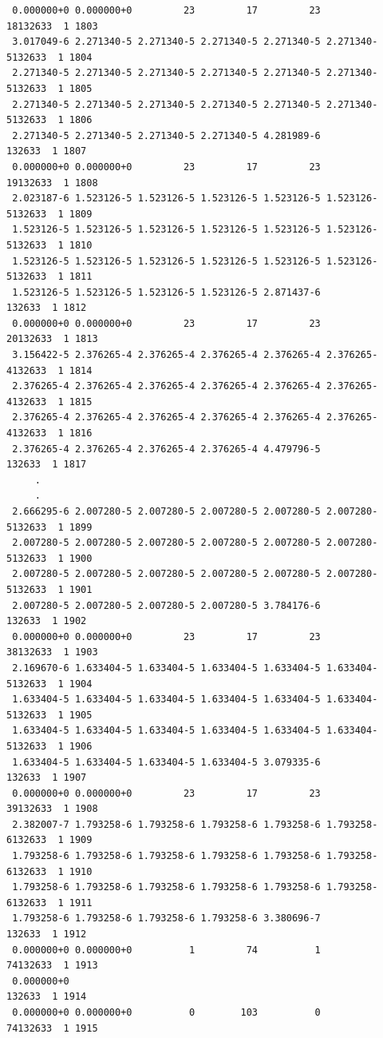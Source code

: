 \begin{verbatim}
 0.000000+0 0.000000+0         23         17         23         18132633  1 1803
 3.017049-6 2.271340-5 2.271340-5 2.271340-5 2.271340-5 2.271340-5132633  1 1804
 2.271340-5 2.271340-5 2.271340-5 2.271340-5 2.271340-5 2.271340-5132633  1 1805
 2.271340-5 2.271340-5 2.271340-5 2.271340-5 2.271340-5 2.271340-5132633  1 1806
 2.271340-5 2.271340-5 2.271340-5 2.271340-5 4.281989-6           132633  1 1807
 0.000000+0 0.000000+0         23         17         23         19132633  1 1808
 2.023187-6 1.523126-5 1.523126-5 1.523126-5 1.523126-5 1.523126-5132633  1 1809
 1.523126-5 1.523126-5 1.523126-5 1.523126-5 1.523126-5 1.523126-5132633  1 1810
 1.523126-5 1.523126-5 1.523126-5 1.523126-5 1.523126-5 1.523126-5132633  1 1811
 1.523126-5 1.523126-5 1.523126-5 1.523126-5 2.871437-6           132633  1 1812
 0.000000+0 0.000000+0         23         17         23         20132633  1 1813
 3.156422-5 2.376265-4 2.376265-4 2.376265-4 2.376265-4 2.376265-4132633  1 1814
 2.376265-4 2.376265-4 2.376265-4 2.376265-4 2.376265-4 2.376265-4132633  1 1815
 2.376265-4 2.376265-4 2.376265-4 2.376265-4 2.376265-4 2.376265-4132633  1 1816
 2.376265-4 2.376265-4 2.376265-4 2.376265-4 4.479796-5           132633  1 1817
     .
     .
 2.666295-6 2.007280-5 2.007280-5 2.007280-5 2.007280-5 2.007280-5132633  1 1899
 2.007280-5 2.007280-5 2.007280-5 2.007280-5 2.007280-5 2.007280-5132633  1 1900
 2.007280-5 2.007280-5 2.007280-5 2.007280-5 2.007280-5 2.007280-5132633  1 1901
 2.007280-5 2.007280-5 2.007280-5 2.007280-5 3.784176-6           132633  1 1902
 0.000000+0 0.000000+0         23         17         23         38132633  1 1903
 2.169670-6 1.633404-5 1.633404-5 1.633404-5 1.633404-5 1.633404-5132633  1 1904
 1.633404-5 1.633404-5 1.633404-5 1.633404-5 1.633404-5 1.633404-5132633  1 1905
 1.633404-5 1.633404-5 1.633404-5 1.633404-5 1.633404-5 1.633404-5132633  1 1906
 1.633404-5 1.633404-5 1.633404-5 1.633404-5 3.079335-6           132633  1 1907
 0.000000+0 0.000000+0         23         17         23         39132633  1 1908
 2.382007-7 1.793258-6 1.793258-6 1.793258-6 1.793258-6 1.793258-6132633  1 1909
 1.793258-6 1.793258-6 1.793258-6 1.793258-6 1.793258-6 1.793258-6132633  1 1910
 1.793258-6 1.793258-6 1.793258-6 1.793258-6 1.793258-6 1.793258-6132633  1 1911
 1.793258-6 1.793258-6 1.793258-6 1.793258-6 3.380696-7           132633  1 1912
 0.000000+0 0.000000+0          1         74          1         74132633  1 1913
 0.000000+0                                                       132633  1 1914
 0.000000+0 0.000000+0          0        103          0         74132633  1 1915

\end{verbatim}
